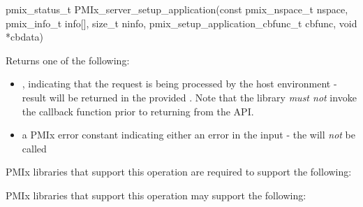 \format

\cspecificstart
\begin{codepar}
pmix_status_t
PMIx_server_setup_application(const pmix_nspace_t nspace,
                        pmix_info_t info[], size_t ninfo,
                        pmix_setup_application_cbfunc_t cbfunc,
                        void *cbdata)
\end{codepar}
\cspecificend

\begin{arglist}
\end{arglist}

Returns one of the following:

\begin{itemize}
    \item {}, indicating that the request is being processed by the host environment - result will be returned in the provided . Note that the library \emph{must not} invoke the callback function prior to returning from the \ac{API}.
    \item a PMIx error constant indicating either an error in the input - the  will \textit{not} be called
\end{itemize}


\reqattrstart
\ac{PMIx} libraries that support this operation are required to support the following:


\reqattrend

\optattrstart
\ac{PMIx} libraries that support this operation may support the following:


